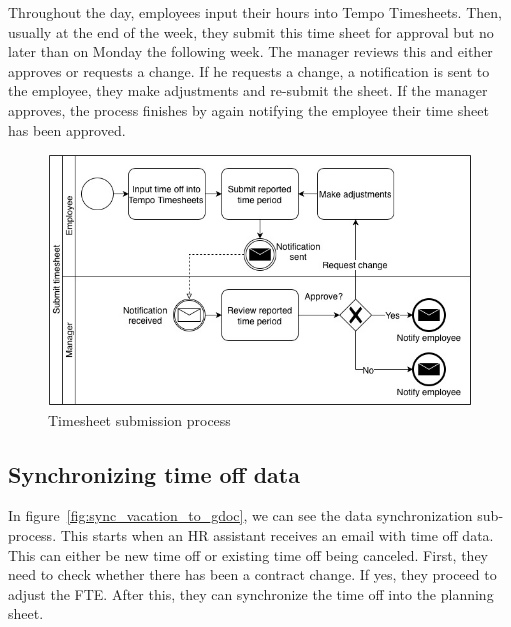 \documentclass[12pt,oneside]{fithesis2}
\begin{document}
Throughout the day, employees input their hours into Tempo Timesheets. Then, usually at the end of the week, they submit this time sheet for approval but no later than on Monday the following week. The manager reviews this and either approves or requests a change. If he requests a change, a notification is sent to the employee, they make adjustments and re-submit the sheet. If the manager approves, the process finishes by again notifying the employee their time sheet has been approved.

\begin{figure}[H]
    \centering
    \includegraphics[width=\textwidth]{images/submit_timesheet.jpg}
    \caption{Timesheet submission process}
    \label{fig:submit_timesheet}
\end{figure}
\newpage
\subsection*{Synchronizing time off data}
In figure~\ref{fig:sync_vacation_to_gdoc}, we can see the data synchronization sub-process. This starts when an HR assistant receives an email with time off data. This can either be new time off or existing time off being canceled. First, they need to check whether there has been a contract change. If yes, they proceed to adjust the FTE. After this, they can synchronize the time off into the planning sheet.
\end{document}
